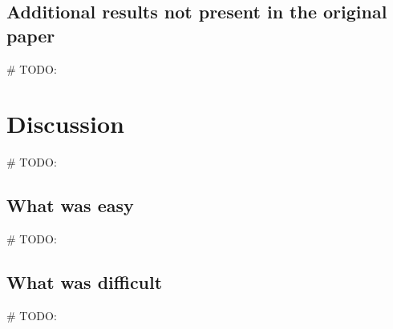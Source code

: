 \documentclass[11pt,a4paper]{article}
\begin{document}
\subsection{Additional results not present in the original paper}
\# TODO:

\section{Discussion}
\# TODO:


\subsection{What was easy}
\# TODO:


\subsection{What was difficult}
\# TODO:
\end{document}
